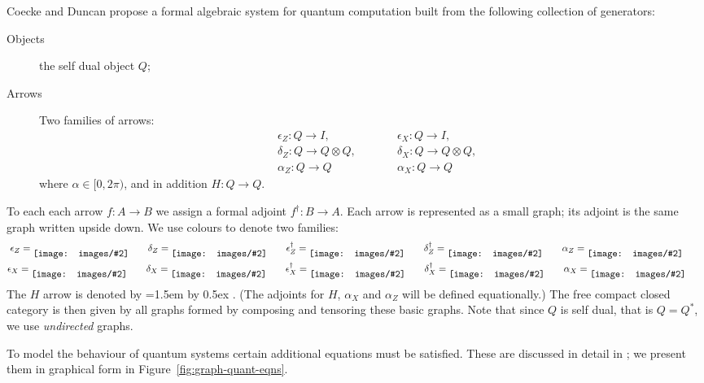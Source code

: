 \documentclass[runningheads]{llncs}
\newcommand{\inlinegraphic}[2]{
  \dimendef\grafheight=255\dimendef\grafvshift=254
  \grafheight=#1
  \grafvshift=-0.5\grafheight
  \advance\grafvshift by 0.5ex
  \raisebox{\grafvshift}{\texttt{[image: images/\#2]}\xspace}
}
\begin{document}
Coecke and Duncan \cite{Coecke:2008jo} propose a formal algebraic
system for quantum computation built from the following collection of
generators:  
\begin{description}
\item[Objects] the self dual object $Q$;
\item[Arrows] Two families of arrows:
  \begin{align*}
  &\epsilon_Z : Q \to I, &\qquad&  \epsilon_X : Q \to I,\\
  &\delta_Z : Q \to Q \otimes Q, && \delta_X : Q \to Q \otimes Q, \\
  &\alpha_Z : Q \to Q &&  \alpha_X : Q \to Q   
  \end{align*}
  where $\alpha \in [0,2\pi)$, and in addition $H:Q\to Q$.
\end{description}
To each each arrow $f : A\to B$ we assign a formal adjoint $f^\dag : B
\to A$.  Each arrow is represented as a small graph; its adjoint is
the same graph written upside down.  We use colours to denote two families:
\begin{gather*}
  \epsilon_Z = \inlinegraphic{1.5em}{epsilon} \qquad
  \delta_Z = \inlinegraphic{1.5em}{delta} \qquad
  \epsilon_Z^\dag = \inlinegraphic{1.5em}{epsilondag} \qquad
  \delta_Z^\dag = \inlinegraphic{1.5em}{deltadag} \qquad
  \alpha_Z = \inlinegraphic{1.5em}{greenalpha} \qquad
\\  
  \epsilon_X = \inlinegraphic{1.5em}{redepsilon} \qquad
  \delta_X = \inlinegraphic{1.5em}{reddelta} \qquad
  \epsilon_X^\dag = \inlinegraphic{1.5em}{redepsilondag} \qquad
  \delta_X^\dag = \inlinegraphic{1.5em}{reddeltadag} \qquad
  \alpha_X = \inlinegraphic{1.5em}{redalpha} \qquad
\end{gather*}
The $H$ arrow is denoted by \inlinegraphic{1.5em}{H}.  (The adjoints
for $H$, $\alpha_X$ and $\alpha_Z$ will be defined equationally.)  The
free compact closed category is then given by all graphs formed by
composing and tensoring these basic graphs.  Note  that since $Q$ is
self dual, that is $Q = Q^*$, we use \emph{undirected} graphs.

To model the behaviour of quantum systems certain additional equations
must be satisfied.  These are discussed in detail in
\cite{Coecke:2008jo};  we present them in graphical form in
Figure~\ref{fig:graph-quant-eqns}.
\end{document}
